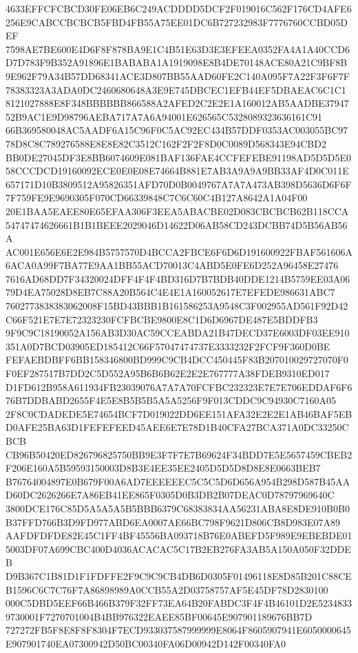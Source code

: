 \documentclass[UTF8,fontset=fandol,zihao=-4,a4paper]{ctexart}
\begin{document}
{{4633EFFCFCBCD30FE06EB6C249ACDDDD5DCF2F019016C562F176CD4AFE6256E9CABCCBCBCB5FBD4FB55A75EE01DC6B727232983F7776760CCBD05DEF
7598AE7BE600E4D6F8F878BA9E1C4B51E63D3E3EFEEA0352FA4A1A40CCD6D7D783F9B352A91896E1BABABA1A1919098E8B4DE70148ACE80A21C9BF8B
9E962F79A34B57DD68341ACE3D807BB55AAD60FE2C140A095F7A22F3F6F7F78383323A3ADA0DC2460680648A3E9E745DBCEC1EFB44EF5DBAEAC6C1C1
8121027888E8F348BBBBBB866588A2AFED2C2E2E1A160012AB5AADBE3794752B9AC1E9D98796AEBA717A7A6A94001E626565C5328089323636161C91
66B369580048AC5AADF6A15C96F0C5AC92EC434B57DDF0353AC003055BC9778D8C8C789276588E8E8E82C3512C162F2F2F8D0C0089D568343E94CBD2
BB0DE27045DF3E8BB6074609E081BAF136FAE4CCFEFEBE91198AD5D5D5E058CCCDCD19160092ECE0E0E08E74664B881E7AB3A9A9A9BB33AF4D0C011E
657171D10B3809512A95826351AFD70D0B0049767A7A7A473AB398D5636D6F6F7F759FE9E9690305F070CD66339848C7C6C60C4B127A8642A1A04F00
20E1BAA5EAEE80E65EFAA306F3EEA5ABACBE02D083CBCBCB62B118CCA54747474626661B1B1BEEE2029046D14622D06AB58CD243DCBB74D5B56AB56A
AC001E656E6E2E984B5757570D4BCCA2FBCE6F6D6D191600922FBAF561606A6ACA0A99F7BA77E9AA1BB55ACD70013C4ABD5E0FE6D252A96458E27476
7616AD68DD7F34320024DFF4F4F4BD316D7B7BDB40DDE1214B5759EE03A0679D4EA75028D8EB7C88A20B564C4E4E1A160052617E7EFEDE986631ABC7
7602773838383062008F15BD43BBB1B161586253A9548C3F002955AD561F92D42C66F521E7E7E72323230FCFBCBE9800E8C1D6D6967DE487E5BDDFB3
9F9C9C18190052A156AB3D30AC59CCEABDA21B47DECD37E6003DF03EE910351A0D7BCD03905ED185412C66F57047474737E3333232F2FCF9F360D0BE
FEFAEBDBFF6BB158346800BD999C9CB4DCC450445F83B207010029727070F0F0EF287517B7DD2C5D552A95B6B6B62E2E2E767777A38FDEB9310ED017
D1FD612B958A611934FB23039076A7A7A70FCFBC232323E7E7E706EDDAF6F676B7DDBABD2655F4E5E8B5B5B5A5A5256F9F013CDDC9C94930C7160A05
2F8C0CDADEDE5E74654BCF7D019022DD6EE151AFA32E2E2E1AB46BAF5EBD0AFE25BA63D1FEFEFEED45AEE6E7E78D1B40CFA27BCA371A0DC33250CBCB
CB96B50420ED826796825750BB9E3F7F7E7B69624F34BDD7E5E5657459CBEB2F206E160A5B59593150003D8B3E4EE35EE2405D5D5D8D8E8E0663BEB7
B76764004897E0B679F00A6AD7EEEEEEC5C5C5D6D656A954B298D587B45AAD60DC2626266E7A86EB41EE865F0305D0B3DB2B07DEAC0D78797969640C
3800DCE176C85D5A5A5A5B5BBB6379C68383834AA56231ABA8E8DE910B0B0B37FFD766B3D9FD977ABD6EA0007AE66BC798F9621D806CB8D983E07A89
AAFDFDFDE82E45C1FF4BF45556BA093718B76E0ABEFD5F989E9EBEBDE015003DF07A699CBC400D4036ACACAC5C17B2EB276FA3AB5A150A050F32DDEB
D9B367C1B81D1F1FDFFE2F9C9C9CB4DB6D0305F01496118E8D85B201C88CEB1596C6C7C76F7A86898989A0CCB55A2D03758757AF5E45DF78D2830100
000C5DBD5EEF66B466B379F32FF73EA64B20FABDC3F4F4B46101D2E52348339730001F7270701004B4BB976322EAEE85BF00645E907901189676BB7D
727272FB5F8E8F8F8304F7ECD933037587999999E8064F8605907941E6050000645E907901740EA07300942D50BC00340FA06D00942D142F00340FA0
}}
\end{document}
